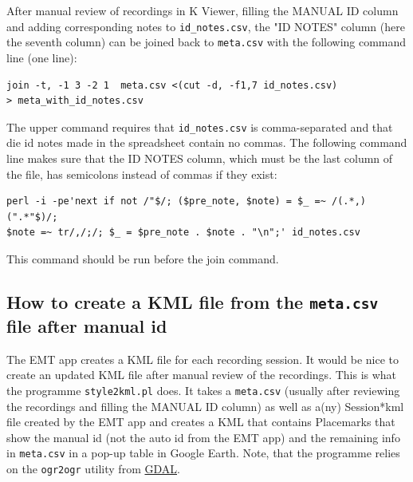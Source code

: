 \documentclass[English, 11pt, twoside, authoryear]{article}
\begin{document}
After manual review of recordings in \textsf{K} Viewer, filling the MANUAL ID column and adding corresponding notes to \texttt{id\_notes.csv}, the "ID NOTES" column (here the seventh column) can be joined back to \texttt{meta.csv} with the following command line (one line):

\begin{lstlisting}
join -t, -1 3 -2 1  meta.csv <(cut -d, -f1,7 id_notes.csv) 
> meta_with_id_notes.csv
\end{lstlisting}

The upper command requires that \texttt{id\_notes.csv} is comma-separated and that die id notes made in the spreadsheet contain no commas. The following command line makes sure that the ID NOTES column, which must be the last column of the file, has semicolons instead of commas if they exist:

\begin{lstlisting}[numbers=none]
perl -i -pe'next if not /"$/; ($pre_note, $note) = $_ =~ /(.*,)(".*"$)/; 
$note =~ tr/,/;/; $_ = $pre_note . $note . "\n";' id_notes.csv
\end{lstlisting}

This command should be run before the \textsf{join} command.

%
%
\subsection{How to create a KML file from the \texttt{meta.csv} file after manual id}
%
%

The EMT app creates a KML file for each recording session. It would be nice to create an updated KML file after manual review of the recordings. This is what the programme \texttt{style2kml.pl} does. It takes a \texttt{meta.csv} (usually after reviewing the recordings and filling the MANUAL ID column) as well as a(ny) Session*kml file created by the EMT app and creates a KML that contains Placemarks that show the manual id (not the auto id from the EMT app) and the remaining info in \texttt{meta.csv} in a pop-up table in Google Earth. Note, that the programme relies on the \texttt{ogr2ogr} utility from \href{https://gdal.org/download.html}{GDAL}.
\end{document}
